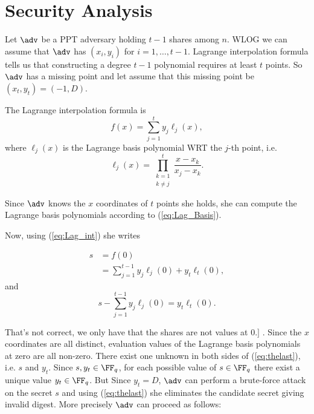 \documentclass[envcountsame,runningheads,notitlepage]{llncs}
\DeclareRobustCommand{\michals}[2] {{\color{magenta}{$\big[$\scriptsize\textsf{Michal #1:}} #2$\big]$}}
\begin{document}
	\iffalse
	\section{Security Analysis}
	Let $\adv$ be a PPT adversary holding $t-1$ shares among $n$. WLOG we can assume that $\adv$ has $(x_{i}, y_{i})$ for $i = 1, \ldots, t-1$. Lagrange interpolation formula tells us that constructing a degree $t - 1$ polynomial requires at least $t$ points. So $\adv$ has a missing point and let assume that this missing point be $(x_{t}, y_{t}) = (-1, D)$.
	
	The Lagrange interpolation formula is
	\begin{equation}\label{eq:Lag_int}
	f(x) = \sum\limits_{j = 1}^{t} y_{j} \ell_{j}(x),
	\end{equation}
	where $\ell_{j}(x)$ is the  Lagrange basis polynomial WRT the $j$-th point, i.e.
	\begin{equation}\label{eq:Lag_Basis}
	\ell_{j}(x) = \prod\limits_{\substack{k = 1 \\ k \neq j}}^{t} \frac{x - x_{k}}{x_{j} - x_{k}}.
	\end{equation}
	
	Since $\adv$ knows the $x$ coordinates of $t$ points she holds, she can compute the Lagrange basis polynomials according to (\ref{eq:Lag_Basis}). 
	
	Now, using (\ref{eq:Lag_int}) she writes
	
	\begin{align*}
	s &= f(0)\\
	&= \sum\limits_{j = 1}^{t-1} y_{j}\ell_{j}(0) + y_{t}\ell_{t}(0),
	\end{align*}
	and 
	\begin{equation}\label{eq:thelast}
	s - \sum\limits_{j = 1}^{t-1} y_{j}\ell_{j}(0) = y_{t}\ell_{t}(0).
	\end{equation}
	
	\michals{12.03.22}{That's not correct, we only have that the shares are not values at 0.} . Since the $x$ coordinates are all distinct, evaluation values of the Lagrange basis polynomials at zero are all non-zero. There exist one unknown in both sides of (\ref{eq:thelast}), i.e. $s$ and $y_{t}$. Since $s, y_{t} \in \FF_q$, for each possible value of $s \in \FF_q$ there exist a unique value $y_{t} \in \FF_q$. But Since $y_{t} = D$, $\adv$ can perform a brute-force attack on the secret $s$ and using (\ref{eq:thelast}) she eliminates the candidate secret giving invalid digest. More precisely $\adv$ can proceed as follows:
	
\end{document}
